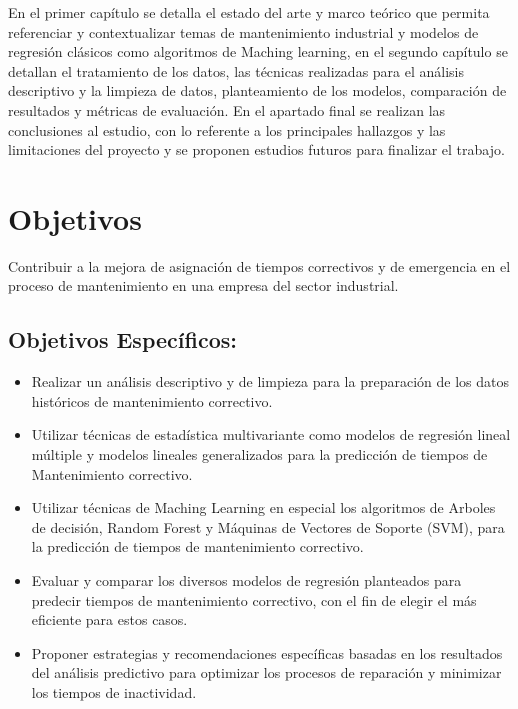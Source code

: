 \documentclass[
  11pt,
  bookmarksnumbered]{article}
\begin{document}
En el primer capítulo se detalla el estado del arte y marco teórico que permita referenciar y contextualizar temas de mantenimiento industrial y modelos de regresión clásicos como algoritmos de Maching learning, en el segundo capítulo se detallan el tratamiento de los datos, las técnicas realizadas para el análisis descriptivo y la limpieza de datos, planteamiento de los modelos, comparación de resultados y métricas de evaluación.
En el apartado final se realizan las conclusiones al estudio, con lo referente a los principales hallazgos y las limitaciones del proyecto y se proponen estudios futuros para finalizar el trabajo.

\newpage

\hypertarget{objetivos}{%
\section{Objetivos}\label{objetivos}}

Contribuir a la mejora de asignación de tiempos correctivos y de emergencia en el proceso de mantenimiento en una empresa del sector industrial.

\hypertarget{objetivos-especuxedficos}{%
\subsection{Objetivos Específicos:}\label{objetivos-especuxedficos}}

\begin{itemize}
\item
  Realizar un análisis descriptivo y de limpieza para la preparación de los datos históricos de mantenimiento correctivo.
\item
  Utilizar técnicas de estadística multivariante como modelos de regresión lineal múltiple y modelos lineales generalizados para la predicción de tiempos de Mantenimiento correctivo.
\item
  Utilizar técnicas de Maching Learning en especial los algoritmos de Arboles de decisión, Random Forest y Máquinas de Vectores de Soporte (SVM), para la predicción de tiempos de mantenimiento correctivo.
\item
  Evaluar y comparar los diversos modelos de regresión planteados para predecir tiempos de mantenimiento correctivo, con el fin de elegir el más eficiente para estos casos.
\item
  Proponer estrategias y recomendaciones específicas basadas en los resultados del análisis predictivo para optimizar los procesos de reparación y minimizar los tiempos de inactividad.
\end{itemize}
\end{document}

